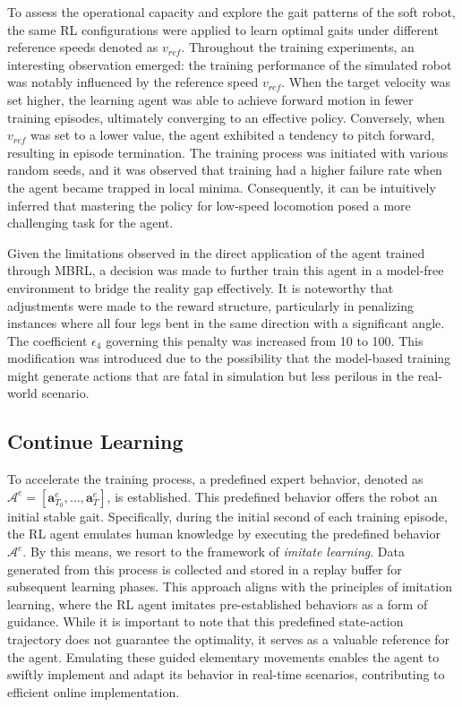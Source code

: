 To assess the operational capacity and explore the gait patterns of the soft robot, the same RL configurations were applied to learn optimal gaits under different reference speeds denoted as $v_{ref}$. Throughout the training experiments, an interesting observation emerged: the training performance of the simulated robot was notably influenced by the reference speed $v_{ref}$. When the target velocity was set higher, the learning agent was able to achieve forward motion in fewer training episodes, ultimately converging to an effective policy. Conversely, when $v_{ref}$ was set to a lower value, the agent exhibited a tendency to pitch forward, resulting in episode termination. The training process was initiated with various random seeds, and it was observed that training had a higher failure rate when the agent became trapped in local minima. Consequently, it can be intuitively inferred that mastering the policy for low-speed locomotion posed a more challenging task for the agent.

Given the limitations observed in the direct application of the agent trained through MBRL, a decision was made to further train this agent in a model-free environment to bridge the reality gap effectively. It is noteworthy that adjustments were made to the reward structure, particularly in penalizing instances where all four legs bent in the same direction with a significant angle. The coefficient $\epsilon_4$ governing this penalty was increased from 10 to 100. This modification was introduced due to the possibility that the model-based training might generate actions that are fatal in simulation but less perilous in the real-world scenario.

\subsection{Continue Learning}
To accelerate the training process, a predefined expert behavior, denoted as $\mathcal{A}^e = [\textbf{a}_{T_0}^e, ..., \textbf{a}_T^e]$, is established\cite{jiSynthesizingOptimalGait2022}. This predefined behavior offers the robot an initial stable gait. Specifically, during the initial second of each training episode, the RL agent emulates human knowledge by executing the predefined behavior $\mathcal{A}^e$. By this means, we resort to the framework of \textit{imitate learning}\cite{koberImitationReinforcementLearning2010}. Data generated from this process is collected and stored in a replay buffer for subsequent learning phases. This approach aligns with the principles of imitation learning, where the RL agent imitates pre-established behaviors as a form of guidance. While it is important to note that this predefined state-action trajectory does not guarantee the optimality, it serves as a valuable reference for the agent. Emulating these guided elementary movements enables the agent to swiftly implement and adapt its behavior in real-time scenarios, contributing to efficient online implementation. 

